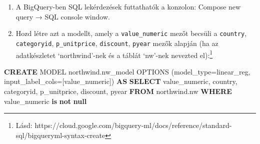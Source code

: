 \documentclass[
  magyar,
]{article}
\newenvironment{Shaded}{}{}
\newcommand{\KeywordTok}[1]{\textcolor[rgb]{0.00,0.44,0.13}{\textbf{#1}}}
\newcommand{\NormalTok}[1]{#1}
\newcommand{\OperatorTok}[1]{\textcolor[rgb]{0.40,0.40,0.40}{#1}}
\newcommand{\StringTok}[1]{\textcolor[rgb]{0.25,0.44,0.63}{#1}}
\providecommand{\tightlist}{%
  \setlength{\itemsep}{0pt}\setlength{\parskip}{0pt}}
\begin{document}
\begin{enumerate}
  \begin{itemize}
  \tightlist
  \item
    \begin{enumerate}
    \def\labelenumii{\alph{enumii}.}
    \tightlist
    \item
      A Dataplex-ből vagy közvetlenül a BigQuery Studióból (a Schema fül
      melletti utolsó fül) hozz létre és indíts el egy igény szerinti
      Profile task feladatot a Quick data profile → Details menüponton.
      Ez a feladat kb. 5 percig fut a háttérben, majd megjeleníti az
      oszlopstatisztikákat és hisztogramokat.
    \end{enumerate}
  \item
    \begin{enumerate}
    \def\labelenumii{\alph{enumii}.}
    \setcounter{enumii}{1}
    \tightlist
    \item
      Indíts el egy Data quality scan feladatot is egy manuálisan
      hozzáadott minőségi szabállyal (pl. Freight \textgreater=0). A
      profil feladat eredménye alapján a `de facto' szabályokat is
      áttekintheted és elfogadhatod (pl. a Freight mezőre levezetett
      szabály: ``min: 0.02, max:1007.64''). Az ellenőrzéssel kapcsolatos
      adminisztratív adatok a Northwind adatkészletben tárolhatók. Az
      eredmények a Dataplex → Data quality oldalon az ellenőrzés nevére
      kattintva, a Jobs history fülön érhetők el.
    \end{enumerate}
  \end{itemize}
\item
  A BigQuery-ben SQL lekérdezések futtathatók a konzolon: Compose new
  query → SQL console window.
\item
  Hozd létre azt a modellt, amely a \texttt{value\_numeric} mezőt
  becsüli a \texttt{country}, \texttt{categoryid},
  \texttt{p\_unitprice}, \texttt{discount}, \texttt{pyear} mezők alapján
  (ha az adatkészletet `northwind'-nek és a táblát `nw'-nek nevezted
  el):\footnote{Lásd:
    https://cloud.google.com/bigquery-ml/docs/reference/standard-sql/bigqueryml-syntax-create}
\end{enumerate}

\begin{Shaded}
\begin{Highlighting}[]
\KeywordTok{CREATE}\NormalTok{ MODEL \textasciigrave{}northwind.nw\_model\textasciigrave{} OPTIONS (model\_type}\OperatorTok{=}\StringTok{\textquotesingle{}linear\_reg\textquotesingle{}}\NormalTok{, input\_label\_cols}\OperatorTok{=}\NormalTok{[}\StringTok{\textquotesingle{}value\_numeric\textquotesingle{}}\NormalTok{]) }\KeywordTok{AS}
\KeywordTok{SELECT}\NormalTok{ value\_numeric, country, categoryid, p\_unitprice, discount, pyear}
\KeywordTok{FROM}\NormalTok{ \textasciigrave{}northwind.nw\textasciigrave{}}
\KeywordTok{WHERE}\NormalTok{ value\_numeric }\KeywordTok{is} \KeywordTok{not} \KeywordTok{null}
\end{Highlighting}
\end{Shaded}
\end{document}
